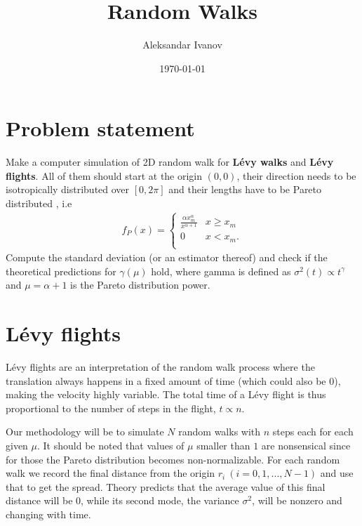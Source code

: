 \documentclass[10pt,a4paper,twocolumn]{article}
\begin{document}
\title{Random Walks}
\author{Aleksandar Ivanov}
\date{\today}
\maketitle


\section{Problem statement}

Make a computer simulation of 2D random walk for \textbf{L\'evy walks} and \textbf{L\'evy flights}. All of them should start at the origin $(0,0)$, their direction needs to be isotropically distributed over $[0, 2\pi]$ and their lengths have to be Pareto distributed \cite{sampling}, i.e
%
\begin{align}
f_P(x)= \begin{cases} 
      \frac{\alpha x_m^\alpha}{x^{\alpha+1}} & x \geq x_m \\
      0 & x < x_m. \\
   \end{cases}
\end{align}
%
Compute the standard deviation (or an estimator thereof) and check if the theoretical predictions for $\gamma(\mu)$ hold, where gamma is defined as $\sigma^2(t) \propto t^{\gamma}$ and $\mu = \alpha + 1$ is the Pareto distribution power.


\section{L\'evy flights}

L\'evy flights \cite{wvsl} are an interpretation of the random walk process where the translation always happens in a fixed amount of time (which could also be $0$), making the velocity highly variable. The total time of a L\'evy flight is thus proportional to the number of steps in the flight, $t \propto n$.

Our methodology will be to simulate $N$ random walks with $n$ steps each for each given $\mu$. It should be noted that values of $\mu$ smaller than $1$ are nonsensical since for those the Pareto distribution becomes non-normalizable. For each random walk we record the final distance  from the origin $r_i \ (i = 0, 1, ...,N-1)$ and use that to get the spread. Theory predicts that the average value of this final distance will be $0$, while its second mode, the variance $\sigma^2$, will be nonzero and changing with time. 
\end{document}
